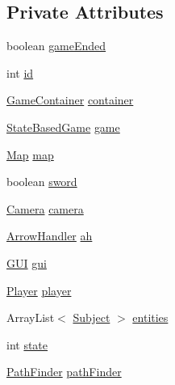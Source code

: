 \subsection*{Private Attributes}
\begin{DoxyCompactItemize}
\item 
boolean \mbox{\hyperlink{classstates_1_1_game_state_a67de2baaf7f13d4c875e9b34a54fed5e}{game\+Ended}}
\item 
int \mbox{\hyperlink{classstates_1_1_game_state_a6753ed5810e190d122a36ede7a52d4b3}{id}}
\item 
\mbox{\hyperlink{classorg_1_1newdawn_1_1slick_1_1_game_container}{Game\+Container}} \mbox{\hyperlink{classstates_1_1_game_state_a88b0df4b57ada742c53e4e1ee3b25827}{container}}
\item 
\mbox{\hyperlink{classorg_1_1newdawn_1_1slick_1_1state_1_1_state_based_game}{State\+Based\+Game}} \mbox{\hyperlink{classstates_1_1_game_state_a5f563e34a3fc7d777396b68e00b321f5}{game}}
\item 
\mbox{\hyperlink{classentities_1_1_map}{Map}} \mbox{\hyperlink{classstates_1_1_game_state_ab5dc1b5f4f87c6fc5684832bfba3b939}{map}}
\item 
boolean \mbox{\hyperlink{classstates_1_1_game_state_af984dc048942d10169fb7127bcc30273}{sword}}
\item 
\mbox{\hyperlink{classentities_1_1_camera}{Camera}} \mbox{\hyperlink{classstates_1_1_game_state_a0ed0ff756171316575f1bb875591b14d}{camera}}
\item 
\mbox{\hyperlink{classitems_1_1weapons_1_1_arrow_handler}{Arrow\+Handler}} \mbox{\hyperlink{classstates_1_1_game_state_ad403f3cc9e4c649012a647fe88ada09f}{ah}}
\item 
\mbox{\hyperlink{classgui_1_1_g_u_i}{G\+UI}} \mbox{\hyperlink{classstates_1_1_game_state_a06c55ea6da4254b914abd92c912036c1}{gui}}
\item 
\mbox{\hyperlink{classentities_1_1_player}{Player}} \mbox{\hyperlink{classstates_1_1_game_state_ae8ec891c55e1c5d43372a289d8a6d87e}{player}}
\item 
Array\+List$<$ \mbox{\hyperlink{classentities_1_1_subject}{Subject}} $>$ \mbox{\hyperlink{classstates_1_1_game_state_abb21bb28c6cdc15af651221a524d5073}{entities}}
\item 
int \mbox{\hyperlink{classstates_1_1_game_state_a5e07b1776e13d009e1a8c6a1e8140d04}{state}}
\item 
\mbox{\hyperlink{classentities_1_1_path_finder}{Path\+Finder}} \mbox{\hyperlink{classstates_1_1_game_state_aeaae3c340636293db4737187e847f764}{path\+Finder}}
\end{DoxyCompactItemize}


